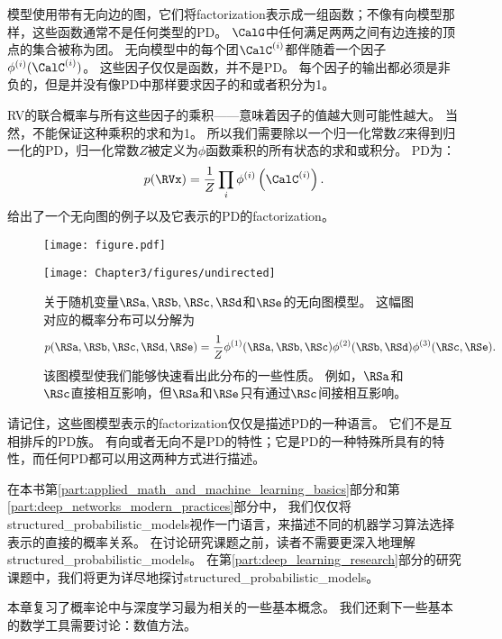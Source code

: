 
模型使用带有无向边的图，它们将\gls{factorization}表示成一组函数；不像有向模型那样，这些函数通常不是任何类型的\gls{PD}。
$\CalG$中任何满足两两之间有边连接的顶点的集合被称为团。
无向模型中的每个团$\CalC^{(i)}$都伴随着一个因子$\phi^{(i)}(\CalC^{(i)})$。
 这些因子仅仅是函数，并不是\gls{PD}。
 每个因子的输出都必须是非负的，但是并没有像\gls{PD}中那样要求因子的和或者积分为1。

\gls{RV}的联合概率与所有这些因子的乘积——意味着因子的值越大则可能性越大。
当然，不能保证这种乘积的求和为1。
所以我们需要除以一个归一化常数$Z$来得到归一化的\gls{PD}，归一化常数$Z$被定义为$\phi$函数乘积的所有状态的求和或积分。
\gls{PD}为：
\begin{equation}
p(\RVx) = \frac{1}{Z} \prod_i \phi^{(i)} \left (\CalC^{(i)} \right).
\end{equation}
给出了一个无向图的例子以及它表示的\gls{PD}的\gls{factorization}。
\begin{figure}[!htb]
\ifOpenSource
\centerline{\texttt{[image: figure.pdf]}}
\else
\centerline{\texttt{[image: Chapter3/figures/undirected]}}
\fi
\captionsetup{singlelinecheck=off}
\caption[.]{关于随机变量$\RSa, \RSb, \RSc, \RSd$和$\RSe$的无向图模型。
这幅图对应的概率分布可以分解为
\begin{equation}
p(\RSa, \RSb, \RSc, \RSd, \RSe) = \frac{1}{Z} \phi^{(1)} (\RSa, \RSb, \RSc) \phi^{(2)}(\RSb, \RSd) \phi^{(3)} (\RSc, \RSe).
\end{equation}
该图模型使我们能够快速看出此分布的一些性质。
例如，$\RSa$和$\RSc$直接相互影响，但$\RSa$和$\RSe$只有通过$\RSc$间接相互影响。}
\label{fig:chap3_undirected}
\end{figure}



请记住，这些图模型表示的\gls{factorization}仅仅是描述\gls{PD}的一种语言。
它们不是互相排斥的\gls{PD}族。
有向或者无向不是\gls{PD}的特性；它是\gls{PD}的一种特殊所具有的特性，而任何\gls{PD}都可以用这两种方式进行描述。

在本书第\ref{part:applied_math_and_machine_learning_basics}部分和第\ref{part:deep_networks_modern_practices}部分中， 我们仅仅将\gls{structured_probabilistic_models}视作一门语言，来描述不同的机器学习算法选择表示的直接的概率关系。
在讨论研究课题之前，读者不需要更深入地理解\gls{structured_probabilistic_models}。
在第\ref{part:deep_learning_research}部分的研究课题中，我们将更为详尽地探讨\gls{structured_probabilistic_models}。

本章复习了概率论中与深度学习最为相关的一些基本概念。
我们还剩下一些基本的数学工具需要讨论：数值方法。

